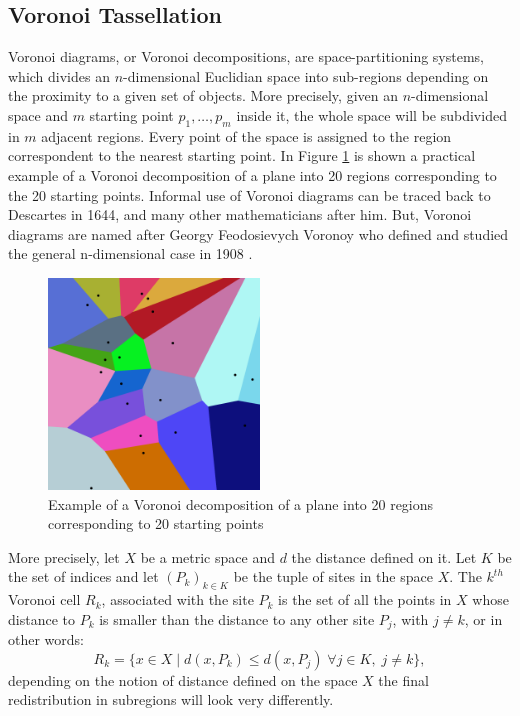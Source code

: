 \subsection{Voronoi Tassellation} \label{ssec:vor_tass}
Voronoi diagrams, or Voronoi decompositions, are space-partitioning systems, which divides an $n$-dimensional Euclidian space into sub-regions depending on the proximity to a given set of objects. More precisely, given an $n$-dimensional space and $m$ starting point $p_1,\dots, p_m$ inside it, the whole space will be subdivided in $m$ adjacent regions. Every point of the space is assigned to the region correspondent to the nearest starting point. In Figure \ref{fig:vor_20} is shown a practical example of a Voronoi decomposition of a plane into 20 regions corresponding to the 20 starting points. Informal use of Voronoi diagrams can be traced back to Descartes in 1644, and many other mathematicians after him. But, Voronoi diagrams are named after Georgy Feodosievych Voronoy who defined and studied the general n-dimensional case in 1908 \cite{VoronoiNouvellesAD}.
\begin{figure}
    \centering
    \includegraphics[width = 0.5\textwidth]{images/vor_20}
    \caption{Example of a Voronoi decomposition of a plane into 20 regions corresponding to 20 starting points}
    \label{fig:vor_20}
\end{figure}

More precisely, let $X$ be a metric space and $d$ the distance defined on it. Let $K$ be the set of indices and let $(P_k)_{k\in K}$ be the tuple of sites in the space $X$. The $k^{th}$ Voronoi cell $R_k$, associated with the site $P_k$ is the set of all the points in $X$ whose distance to $P_k$ is smaller than the distance to any other site $P_j$, with $j\neq k$, or in other words:
\begin{equation}
    R_k = \{x \in X\;|\;d(x,P_k) \le d(x,P_j)\; \forall j \in K, \;j\neq k \}, \label{eq:formal_Vor_def}
\end{equation}
depending on the notion of distance defined on the space $X$ the final redistribution in subregions will look very differently.

